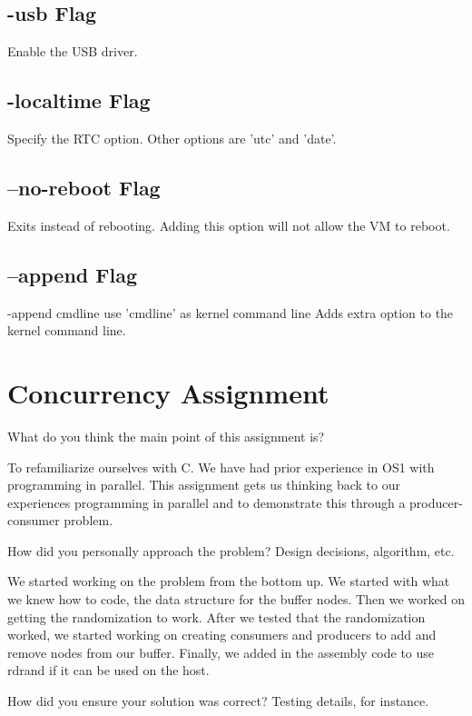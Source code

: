 \documentclass{article}
\newenvironment{question}[2][Question]	{\begin{trivlist}
\item[\hskip \labelsep {\bfseries #1}\hskip \labelsep {\bfseries #2.}]}
{\end{trivlist}} %
\begin{document}
\subsection{-usb Flag}
Enable the USB driver.

\subsection{-localtime Flag}
Specify the RTC option. Other options are 'utc' and 'date'.

\subsection{--no-reboot Flag}
Exits instead of rebooting. Adding this option will not allow the VM to reboot.

\subsection{--append Flag}
-append cmdline use 'cmdline' as kernel command line
Adds extra option to the kernel command line.

\section{Concurrency Assignment}
\begin{question}{1}
What do you think the main point of this assignment is?
\end{question}

To refamiliarize ourselves with C. We have had prior experience in OS1 with programming in parallel. This assignment gets us thinking back to our experiences programming in parallel and to demonstrate this through a producer-consumer problem.

\begin{question}{2}
How did you personally approach the problem? Design decisions, algorithm, etc.
\end{question}

We started working on the problem from the bottom up. We started with what we knew how to code, the data structure for the buffer nodes. Then we worked on getting the randomization to work. After we tested that the randomization worked, we started working on creating consumers and producers to add and remove nodes from our buffer. Finally, we added in the assembly code to use rdrand if it can be used on the host. 

\begin{question}{3}
How did you ensure your solution was correct? Testing details, for instance.
\end{question}
\end{document}
